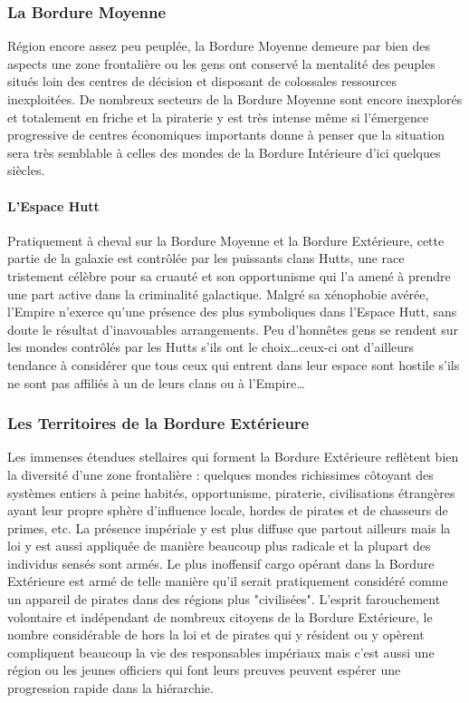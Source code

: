 \documentclass[twoside]{article}
\begin{document}
\subsubsection{La Bordure Moyenne}
Région encore assez peu peuplée, la Bordure Moyenne demeure par bien des aspects une zone frontalière ou les gens ont conservé la mentalité des peuples situés loin des centres de décision et disposant de colossales ressources inexploitées. De nombreux secteurs de la Bordure Moyenne sont encore inexplorés et totalement en friche et la piraterie y est très intense même si l'émergence progressive de centres économiques importants donne à penser que la situation sera très semblable à celles des mondes de la Bordure Intérieure d'ici quelques siècles.

\paragraph{L'Espace Hutt}
Pratiquement à cheval sur la Bordure Moyenne et la Bordure Extérieure, cette partie de la galaxie est contrôlée par les puissants clans Hutts, une race tristement célèbre pour sa cruauté et son opportunisme qui l'a amené à prendre une part active dans la criminalité galactique. Malgré sa xénophobie avérée, l'Empire n'exerce qu'une présence des plus symboliques dans l'Espace Hutt, sans doute le résultat d'inavouables arrangements. Peu d'honnêtes gens se rendent sur les mondes contrôlés par les Hutts s'ils ont le choix\ldots ceux-ci ont d'ailleurs tendance à considérer que tous ceux qui entrent dans leur espace sont hostile s'ils ne sont pas affiliés à un de leurs clans ou à l'Empire\ldots

\subsubsection{Les Territoires de la Bordure Extérieure}
Les immenses étendues stellaires qui forment la Bordure Extérieure reflètent bien la diversité d'une zone frontalière : quelques mondes richissimes côtoyant des systèmes entiers à peine habités, opportunisme, piraterie, civilisations étrangères ayant leur propre sphère d'influence locale, hordes de pirates et de chasseurs de primes, etc. La présence impériale y est plus diffuse que partout ailleurs mais la loi y est aussi appliquée de manière beaucoup plus radicale et la plupart des individus sensés sont armés. Le plus inoffensif cargo opérant dans la Bordure Extérieure est armé de telle manière qu'il serait pratiquement considéré comme un appareil de pirates dans des régions plus "civilisées". L'esprit farouchement volontaire et indépendant de nombreux citoyens de la Bordure Extérieure, le nombre considérable de hors la loi et de pirates qui y résident ou y opèrent compliquent beaucoup la vie des responsables impériaux mais c'est aussi une région ou les jeunes officiers qui font leurs preuves peuvent espérer une progression rapide dans la hiérarchie.
\end{document}
